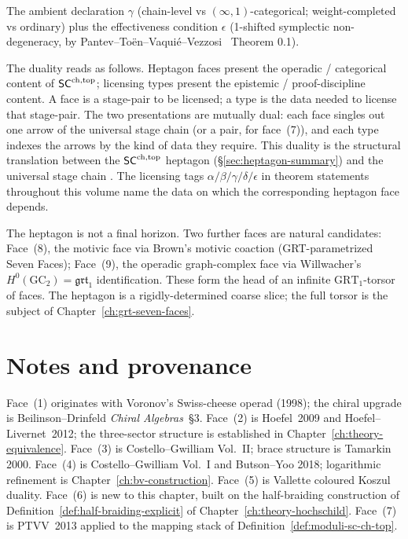 \begin{remark}
\begin{enumerate}[label=\textup{(\arabic*)}]
The ambient declaration $\gamma$ (chain-level vs $(\infty,1)$-categorical;
weight-completed vs ordinary) plus the effectiveness condition
$\epsilon$ (1-shifted symplectic non-degeneracy, by
Pantev--To{\"e}n--Vaqui{\'e}--Vezzosi~\cite{PTVV13} Theorem 0.1).
\end{enumerate}
The duality reads as follows. Heptagon faces present the operadic
/ categorical content of $\mathsf{SC}^{\mathrm{ch},\mathrm{top}}$; licensing types present the
epistemic / proof-discipline content. A face is a stage-pair to be
licensed; a type is the data needed to license that stage-pair.
The two presentations are mutually dual: each face singles out one
arrow of the universal stage chain (or a pair, for face~(7)), and
each type indexes the arrows by the kind of data they require.
This duality is the structural translation between
the $\mathsf{SC}^{\mathrm{ch},\mathrm{top}}$ heptagon (\S\ref{sec:heptagon-summary}) and the
universal stage chain \cite[\S4]{Critique20260509v2}.
The licensing tags $\alpha / \beta / \gamma / \delta / \epsilon$
in theorem statements throughout this volume name the data on
which the corresponding heptagon face depends.
\end{remark}

\begin{remark}\label{rem:heptagon-beyond}
The heptagon is not a final horizon. Two further faces are natural
candidates: Face~(8), the motivic face via Brown's motivic coaction
(GRT-parametrized Seven Faces); Face~(9),
the operadic graph-complex face via Willwacher's
$H^0(\mathrm{GC}_2)=\mathfrak{grt}_1$ identification. These form
the head of an infinite $\mathrm{GRT}_1$-torsor of faces. The
heptagon is a rigidly-determined coarse slice; the full torsor is
the subject of Chapter~\ref{ch:grt-seven-faces}.
\end{remark}

\section*{Notes and provenance}

Face~(1) originates with Voronov's Swiss-cheese operad (1998); the
chiral upgrade is Beilinson--Drinfeld \textit{Chiral Algebras}~\S3.
Face~(2) is Hoefel~2009 and Hoefel--Livernet~2012; the three-sector
structure is established in Chapter~\ref{ch:theory-equivalence}.
Face~(3) is Costello--Gwilliam Vol.~II; brace structure is Tamarkin
2000. Face~(4) is Costello--Gwilliam Vol.~I and Butson--Yoo 2018;
logarithmic refinement is Chapter~\ref{ch:bv-construction}. Face~(5)
is Vallette coloured Koszul duality. Face~(6) is new to this chapter,
built on the half-braiding construction of
Definition~\ref{def:half-braiding-explicit} of
Chapter~\ref{ch:theory-hochschild}. Face~(7) is
PTVV~2013 applied to the mapping stack of
Definition~\ref{def:moduli-sc-ch-top}.

